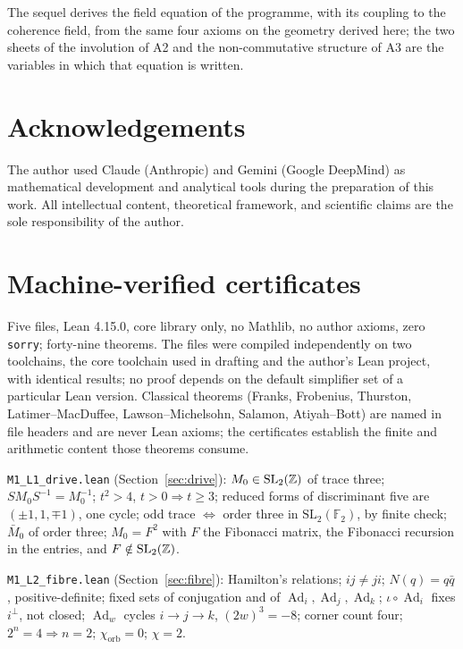 \documentclass[11pt,a4paper]{article}
\theoremstyle{plain}
\theoremstyle{definition}
\theoremstyle{remark}
\newcommand{\Ad}{\operatorname{Ad}}
\begin{document}
The sequel derives the field equation of the programme, with its coupling to the coherence field, from the same four axioms on the geometry derived here; the two sheets of the involution of A2 and the non-commutative structure of A3 are the variables in which that equation is written.

\section*{Acknowledgements}
The author used Claude (Anthropic) and Gemini (Google DeepMind) as mathematical development and analytical tools during the preparation of this work. All intellectual content, theoretical framework, and scientific claims are the sole responsibility of the author.

\appendix

\section{Machine-verified certificates}\label{app:lean}

Five files, Lean 4.15.0, core library only, no Mathlib, no author axioms, zero \texttt{sorry}; forty-nine theorems. The files were compiled independently on two toolchains, the core toolchain used in drafting and the author's Lean project, with identical results; no proof depends on the default simplifier set of a particular Lean version. Classical theorems (Franks, Frobenius, Thurston, Latimer--MacDuffee, Lawson--Michelsohn, Salamon, Atiyah--Bott) are named in file headers and are never Lean axioms; the certificates establish the finite and arithmetic content those theorems consume.

\texttt{M1\_L1\_drive.lean} (Section~\ref{sec:drive}): $M_{0}\in\mathrm{SL}_{2}(\mathbb{Z})$ of trace three; $SM_{0}S^{-1}=M_{0}^{-1}$; $t^{2}>4$, $t>0\Rightarrow t\geq3$; reduced forms of discriminant five are $(\pm1,1,\mp1)$, one cycle; odd trace $\Leftrightarrow$ order three in $\mathrm{SL}_{2}(\mathbb{F}_{2})$, by finite check; $\bar M_{0}$ of order three; $M_{0}=F^{2}$ with $F$ the Fibonacci matrix, the Fibonacci recursion in the entries, and $F\notin\mathrm{SL}_{2}(\mathbb{Z})$.

\texttt{M1\_L2\_fibre.lean} (Section~\ref{sec:fibre}): Hamilton's relations; $ij\neq ji$; $N(q)=q\bar q$, positive-definite; fixed sets of conjugation and of $\Ad_{i},\Ad_{j},\Ad_{k}$; $\iota\circ\Ad_{i}$ fixes $i^{\perp}$, not closed; $\Ad_{w}$ cycles $i\to j\to k$, $(2w)^{3}=-8$; corner count four; $2^{n}=4\Rightarrow n=2$; $\chi_{\mathrm{orb}}=0$; $\chi=2$.
\end{document}
